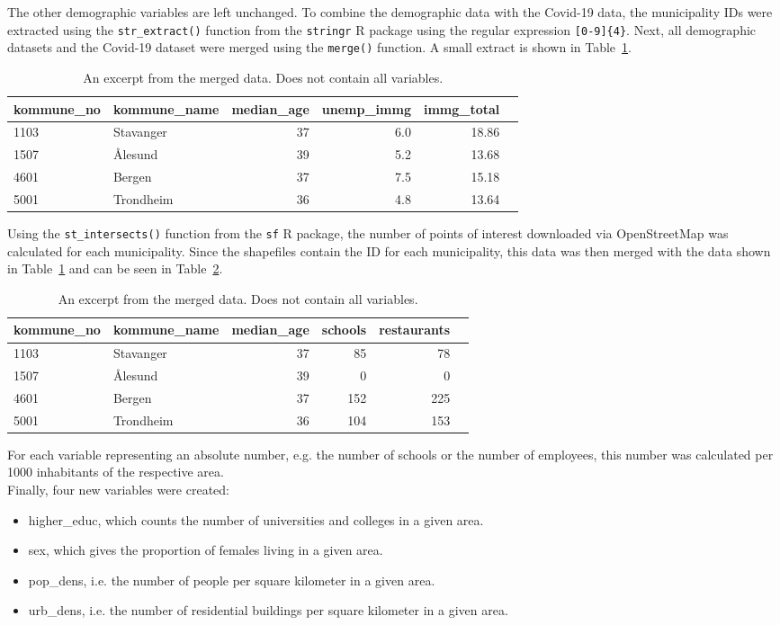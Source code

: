 The other demographic variables are left unchanged. To combine the demographic data with the Covid-19 data, the municipality IDs were extracted using the \texttt{str\_extract()} function from the \texttt{stringr} \cite{stringr} R package using the regular expression \texttt{[0-9]\{4\}}. Next, all demographic datasets and the Covid-19 dataset were merged using the \texttt{merge()} function. A small extract is shown in Table~\ref{mergeNorway1}.
\begin{table}[H] 
\caption{An excerpt from the merged data. Does not contain all variables.\label{mergeNorway1}}
\begin{tabular}{l l r r r r}
\toprule
\textbf{kommune\_no} & \textbf{kommune\_name} & \textbf{median\_age} & \textbf{unemp\_immg} & \textbf{immg\_total}\\
\midrule
1103 & Stavanger & 37 & 6.0 & 18.86\\
1507 & Ålesund & 39 & 5.2 & 13.68\\
4601 & Bergen  & 37  & 7.5 & 15.18\\
5001 & Trondheim  & 36  & 4.8 & 13.64\\
\bottomrule
\end{tabular}
\end{table}
Using the \texttt{st\_intersects()} function from the \texttt{sf} \cite{sf} R package, the number of points of interest downloaded via OpenStreetMap was calculated for each municipality. Since the shapefiles contain the ID for each municipality, this data was then merged with the data shown in Table~\ref{mergeNorway1} and can be seen in Table~\ref{mergeNorway2}.
\begin{table}[H] 
\caption{An excerpt from the merged data. Does not contain all variables.\label{mergeNorway2}}
\begin{tabular}{l l r r r r}
\toprule
\textbf{kommune\_no} & \textbf{kommune\_name} & \textbf{median\_age} & \textbf{schools} & \textbf{restaurants}\\
\midrule
1103 & Stavanger & 37 & 85 & 78 \\
1507 & Ålesund & 39 & 0 & 0\\
4601 & Bergen  & 37  & 152 & 225\\
5001 & Trondheim  & 36  & 104 & 153\\
\bottomrule
\end{tabular}
\end{table}
For each variable representing an absolute number, e.g. the number of schools or the number of employees, this number was calculated per 1000 inhabitants of the respective area. \\
Finally, four new variables were created:
\begin{itemize}
    \item[1.] higher\_educ, which counts the number of universities and colleges in a given area.
    \item[2.] sex, which gives the proportion of females living in a given area.
    \item[3.] pop\_dens, i.e. the number of people per square kilometer in a given area.
    \item[3.] urb\_dens, i.e. the number of residential buildings per square kilometer in a given area.
\end{itemize}

